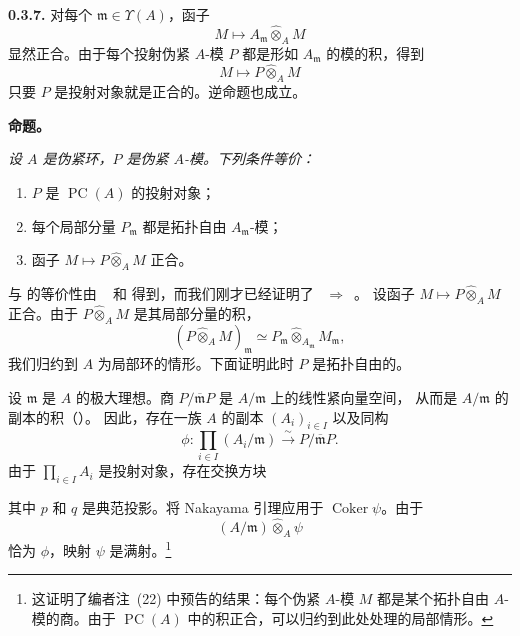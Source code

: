 \medskip
\noindent\textbf{0.3.7.}
\label{sga3:VIIB:0.3.7}
对每个 \(\mathfrak m\in\Upsilon(A)\)，函子
\[
  M\longmapsto A_{\mathfrak m}\widehat{\otimes}_A M
\]
显然正合。由于每个投射伪紧 \(A\)-模 \(P\) 都是形如
\(A_{\mathfrak m}\) 的模的积，得到
\[
  M\longmapsto P\widehat{\otimes}_A M
\]
只要 \(P\) 是投射对象就是正合的。逆命题也成立。

\medskip
\noindent\textbf{命题。}
\label{sga3:VIIB:0.3.7-proposition}
{\itshape 设 \(A\) 是伪紧环，\(P\) 是伪紧 \(A\)-模。下列条件等价：
\begin{enumerate}
  \item[\textup{(i)}]
  \(P\) 是 \(\operatorname{PC}(A)\) 的投射对象；
  \item[\textup{(ii)}]
  每个局部分量 \(P_{\mathfrak m}\) 都是拓扑自由 \(A_{\mathfrak m}\)-模；
  \item[\textup{(iii)}]
  函子 \(M\mapsto P\widehat{\otimes}_A M\) 正合。
\end{enumerate}}

 与
 的等价性由
~ 和
 得到，而我们刚才已经证明了
~\(\Rightarrow\)~。
设函子 \(M\mapsto P\widehat{\otimes}_A M\) 正合。由于
\(P\widehat{\otimes}_A M\) 是其局部分量的积，
\[
  (P\widehat{\otimes}_A M)_{\mathfrak m}
  \simeq
  P_{\mathfrak m}
    \widehat{\otimes}_{A_{\mathfrak m}}M_{\mathfrak m},
\]
我们归约到 \(A\) 为局部环的情形。下面证明此时 \(P\) 是拓扑自由的。

设 \(\mathfrak m\) 是 \(A\) 的极大理想。商
\(P/\overline{\mathfrak m}P\) 是 \(A/\mathfrak m\) 上的线性紧向量空间，
从而是 \(A/\mathfrak m\) 的副本的积（）。
因此，存在一族 \(A\) 的副本 \((A_i)_{i\in I}\) 以及同构
\[
  \phi:
  \prod_{i\in I}(A_i/\mathfrak m)
  \xrightarrow{\sim}
  P/\overline{\mathfrak m}P.
\]
由于 \(\prod_{i\in I}A_i\) 是投射对象，存在交换方块
\begin{center}
  \label{sga3:VIIB:0.3.7-projective-lift-square}
  
\end{center}
其中 \(p\) 和 \(q\) 是典范投影。将 Nakayama 引理应用于
\(\operatorname{Coker}\psi\)。由于
\[
  (A/\mathfrak m)\widehat{\otimes}_A\psi
\]
恰为 \(\phi\)，映射 \(\psi\) 是满射。\footnote{这证明了编者注~(22) 中预告的结果：每个伪紧 \(A\)-模 \(M\) 都是某个拓扑自由
\(A\)-模的商。由于 \(\operatorname{PC}(A)\) 中的积正合，可以归约到此处处理的局部情形。}

